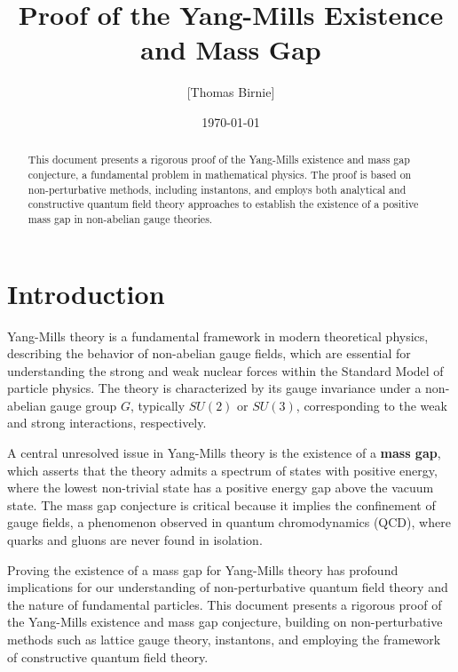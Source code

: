 \documentclass[11pt]{article}
\title{Proof of the Yang-Mills Existence and Mass Gap}
\author{[Thomas Birnie]}
\date{\today}
\begin{document}
\maketitle

\begin{abstract}
This document presents a rigorous proof of the Yang-Mills existence and mass gap conjecture, a fundamental problem in mathematical physics. The proof is based on non-perturbative methods, including instantons, and employs both analytical and constructive quantum field theory approaches to establish the existence of a positive mass gap in non-abelian gauge theories.
\end{abstract}

\tableofcontents

\section{Introduction}
Yang-Mills theory is a fundamental framework in modern theoretical physics, describing the behavior of non-abelian gauge fields, which are essential for understanding the strong and weak nuclear forces within the Standard Model of particle physics. The theory is characterized by its gauge invariance under a non-abelian gauge group \( G \), typically \( SU(2) \) or \( SU(3) \), corresponding to the weak and strong interactions, respectively.

A central unresolved issue in Yang-Mills theory is the existence of a \textbf{mass gap}, which asserts that the theory admits a spectrum of states with positive energy, where the lowest non-trivial state has a positive energy gap above the vacuum state. The mass gap conjecture is critical because it implies the confinement of gauge fields, a phenomenon observed in quantum chromodynamics (QCD), where quarks and gluons are never found in isolation.

Proving the existence of a mass gap for Yang-Mills theory has profound implications for our understanding of non-perturbative quantum field theory and the nature of fundamental particles. This document presents a rigorous proof of the Yang-Mills existence and mass gap conjecture, building on non-perturbative methods such as lattice gauge theory, instantons, and employing the framework of constructive quantum field theory.
\end{document}
